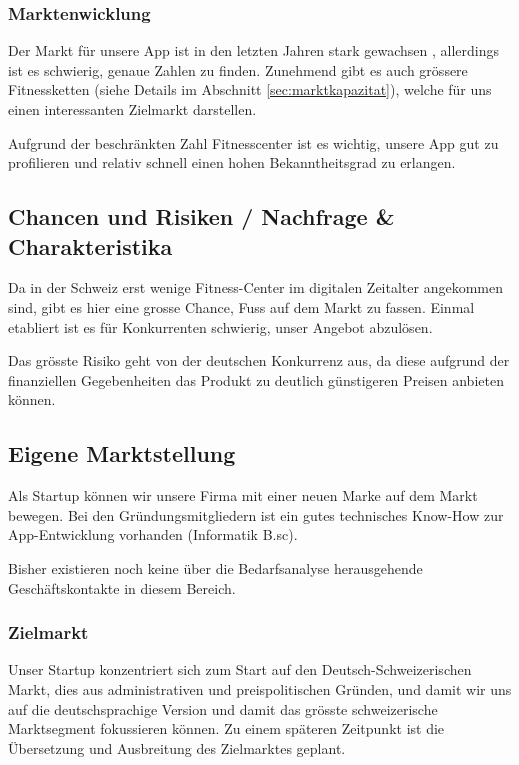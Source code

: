 \subsubsection{Marktenwicklung}
Der Markt für unsere App ist in den letzten Jahren stark gewachsen \cite{fitness-studios+1+milliarde}\cite{fitness+tribune}, allerdings ist es schwierig, genaue Zahlen zu finden. Zunehmend gibt es auch grössere Fitnessketten (siehe Details im Abschnitt \ref{sec:marktkapazitat}), welche für uns einen interessanten Zielmarkt darstellen.

Aufgrund der beschränkten Zahl Fitnesscenter ist es wichtig, unsere App gut zu profilieren und relativ schnell einen hohen Bekanntheitsgrad zu erlangen.

\subsection{Chancen und Risiken / Nachfrage \& Charakteristika}

Da in der Schweiz erst wenige Fitness-Center im digitalen Zeitalter angekommen sind, gibt es hier eine grosse Chance, Fuss auf dem Markt zu fassen. Einmal etabliert ist es für Konkurrenten schwierig, unser Angebot abzulösen.

Das grösste Risiko geht von der deutschen Konkurrenz aus, da diese aufgrund der finanziellen Gegebenheiten das Produkt zu deutlich günstigeren Preisen anbieten können.


\subsection{Eigene Marktstellung}

Als Startup können wir unsere Firma mit einer neuen Marke auf dem Markt bewegen. Bei den Gründungsmitgliedern ist ein gutes technisches Know-How zur App-Entwicklung vorhanden (Informatik B.sc).

Bisher existieren noch keine über die Bedarfsanalyse herausgehende Geschäftskontakte in diesem Bereich.


\subsubsection{Zielmarkt}

Unser Startup konzentriert sich zum Start auf den Deutsch-Schweizerischen Markt, dies aus administrativen und preispolitischen Gründen, und damit wir uns auf die deutschsprachige Version und damit das grösste schweizerische Marktsegment fokussieren können. Zu einem späteren Zeitpunkt ist die Übersetzung und Ausbreitung des Zielmarktes geplant.

